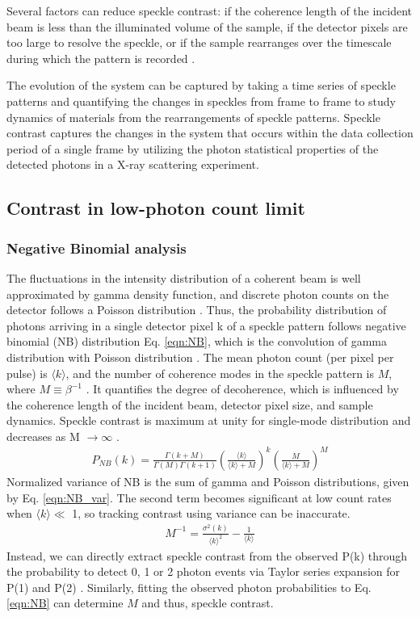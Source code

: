 \documentclass[11pt]{article}
\theoremstyle{definition}
\newcommand{\kk}{\langle k \rangle}
\begin{document}
Several factors can reduce speckle contrast: if the coherence length of the incident beam is less than the illuminated volume of the sample, if the detector pixels are too large to resolve the speckle, or if the sample rearranges over the timescale during which the pattern is recorded \cite{hruszkewycz_high_2012}. 

The evolution of the system can be captured by taking a time series of speckle patterns and quantifying the changes in speckles from frame to frame to study dynamics of materials from the rearrangements of speckle patterns. Speckle contrast captures the changes in the system that occurs within the data collection period of a single frame by utilizing the photon statistical properties of the detected photons in a X-ray scattering experiment. 

\subsection{Contrast in low-photon count limit}
\subsubsection{Negative Binomial analysis}
The fluctuations in the intensity distribution of a coherent beam is well approximated by gamma density function, and discrete photon counts on the detector follows a Poisson distribution \cite{goodman_speckle_2020}. Thus, the probability distribution of photons arriving in a single detector pixel k of a speckle pattern follows negative binomial (NB) distribution Eq. \ref{eqn:NB}, which is the convolution of gamma distribution with Poisson distribution \cite{goodman_speckle_2020}. The mean photon count (per pixel per pulse) is $\kk$, and the number of coherence modes in the speckle pattern is \( M \), where \(M \equiv \beta^{-1} \) \cite{hruszkewycz_high_2012}. It quantifies the degree of decoherence, which is influenced by the coherence length of the incident beam, detector pixel size, and sample dynamics. Speckle contrast is maximum at unity for single-mode distribution and decreases as M $\rightarrow \infty$ \cite{hruszkewycz_high_2012}. 
\begin{align}\label{eqn:NB}
P_{NB}(k) = \frac{\Gamma(k+M)}{\Gamma(M)\Gamma(k+1)} \left(\frac{\kk}{\kk+M}\right)^k \left(\frac{M}{\kk +M}\right)^M
\end{align}
Normalized variance of NB is the sum of gamma and Poisson distributions, given by Eq. \ref{eqn:NB_var}. The second term becomes significant at low count rates when $\langle k \rangle \ll$ 1, so tracking contrast using variance can be inaccurate. 
\begin{align}\label{eqn:NB_var}
M^{-1} = \frac{\sigma^2(k)}{\kk^2} - \frac{1}{\kk}
\end{align}
Instead, we can directly extract speckle contrast from the observed P(k) through the probability to detect 0, 1 or 2 photon events via Taylor series expansion for P(1) and P(2) \cite{hruszkewycz_high_2012}. Similarly, fitting the observed photon probabilities to Eq. \ref{eqn:NB} can determine \( M \) and thus, speckle contrast.
\end{document}
